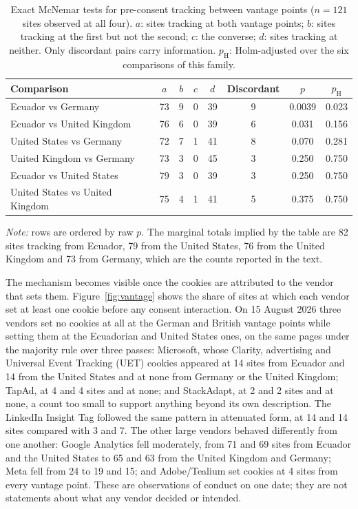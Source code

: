 \documentclass[pdflatex,sn-basic,Numbered,iicol]{sn-jnl}
\theoremstyle{thmstyleone}
\theoremstyle{thmstyletwo}
\theoremstyle{thmstylethree}
\begin{document}
\begin{table}[htbp]
	\centering
	\caption{Exact McNemar tests for pre-consent tracking between vantage points ($n=121$ sites observed at all four). $a$: sites tracking at both vantage points; $b$: sites tracking at the first but not the second; $c$: the converse; $d$: sites tracking at neither. Only discordant pairs carry information. $p_{\text{H}}$: Holm-adjusted over the six comparisons of this family.}\label{tab:vantage}
	\small
	\begin{tabular}{@{}lccccccc@{}}
		\toprule
		\textbf{Comparison} & $a$ & $b$ & $c$ & $d$ & \textbf{Discordant} & \textbf{$p$} & \textbf{$p_{\text{H}}$} \\
		\midrule
		Ecuador vs Germany & 73 & 9 & 0 & 39 & 9 & 0.0039 & 0.023 \\
		Ecuador vs United Kingdom & 76 & 6 & 0 & 39 & 6 & 0.031 & 0.156 \\
		United States vs Germany & 72 & 7 & 1 & 41 & 8 & 0.070 & 0.281 \\
		United Kingdom vs Germany & 73 & 3 & 0 & 45 & 3 & 0.250 & 0.750 \\
		Ecuador vs United States & 79 & 3 & 0 & 39 & 3 & 0.250 & 0.750 \\
		United States vs United Kingdom & 75 & 4 & 1 & 41 & 5 & 0.375 & 0.750 \\
		\bottomrule
	\end{tabular}
	\par\vspace{3pt}
	\footnotesize\RaggedRight\textit{Note:} rows are ordered by raw $p$. The marginal totals implied by the table are 82 sites tracking from Ecuador, 79 from the United States, 76 from the United Kingdom and 73 from Germany, which are the counts reported in the text.
\end{table}

The mechanism becomes visible once the cookies are attributed to the vendor that sets them. Figure~\ref{fig:vantage} shows the share of sites at which each vendor set at least one cookie before any consent interaction. On 15 August 2026 three vendors set no cookies at all at the German and British vantage points while setting them at the Ecuadorian and United States ones, on the same pages under the majority rule over three passes: Microsoft, whose Clarity, advertising and Universal Event Tracking (UET) cookies appeared at 14 sites from Ecuador and 14 from the United States and at none from Germany or the United Kingdom; TapAd, at 4 and 4 sites and at none; and StackAdapt, at 2 and 2 sites and at none, a count too small to support anything beyond its own description. The LinkedIn Insight Tag followed the same pattern in attenuated form, at 14 and 14 sites compared with 3 and 7. The other large vendors behaved differently from one another: Google Analytics fell moderately, from 71 and 69 sites from Ecuador and the United States to 65 and 63 from the United Kingdom and Germany; Meta fell from 24 to 19 and 15; and Adobe/Tealium set cookies at 4 sites from every vantage point. These are observations of conduct on one date; they are not statements about what any vendor decided or intended.
\end{document}
